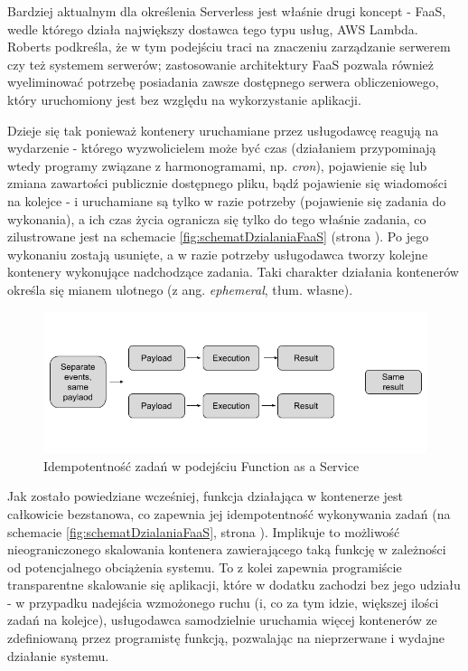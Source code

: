 \documentclass[oneside]{mgr}
\begin{document}
Bardziej aktualnym dla określenia Serverless jest właśnie drugi koncept - FaaS, wedle którego działa największy dostawca tego typu usług, AWS Lambda. Roberts podkreśla, że w tym podejściu traci na znaczeniu zarządzanie serwerem czy też systemem serwerów; zastosowanie architektury FaaS pozwala również wyeliminować potrzebę posiadania zawsze dostępnego serwera obliczeniowego, który uruchomiony jest bez względu na wykorzystanie aplikacji.

Dzieje się tak ponieważ kontenery uruchamiane przez usługodawcę reagują na wydarzenie - którego wyzwolicielem może być czas (działaniem przypominają wtedy programy związane z harmonogramami, np. \textit{cron}), pojawienie się lub zmiana zawartości publicznie dostępnego pliku, bądź pojawienie się wiadomości na kolejce - i uruchamiane są tylko w razie potrzeby (pojawienie się zadania do wykonania), a ich czas życia ogranicza się tylko do tego właśnie zadania, co zilustrowane jest na schemacie \ref{fig:schematDzialaniaFaaS} (strona \pageref{fig:schematDzialaniaFaaS}). Po jego wykonaniu zostają usunięte, a w razie potrzeby usługodawca tworzy kolejne kontenery wykonujące nadchodzące zadania. Taki charakter działania kontenerów określa się mianem ulotnego (z ang. \textit{ephemeral}, tłum. własne).

\begin{figure}
	\centering
	\includegraphics[width=15cm]{0-zJwqKxUVXdMjDboR}
	\caption{Idempotentność zadań w podejściu Function as a Service \cite{kenFrommThinkingServerless}}
	\label{fig:idempotentnoscFaaS}
\end{figure}

Jak zostało powiedziane wcześniej, funkcja działająca w kontenerze jest całkowicie bezstanowa, co zapewnia jej idempotentność wykonywania zadań (na schemacie \ref{fig:schematDzialaniaFaaS}, strona \pageref{fig:schematDzialaniaFaaS}). Implikuje to możliwość nieograniczonego skalowania kontenera zawierającego taką funkcję w zależności od potencjalnego obciążenia systemu. To z kolei zapewnia programiście transparentne skalowanie się aplikacji, które w dodatku zachodzi bez jego udziału - w przypadku nadejścia wzmożonego ruchu (i, co za tym idzie, większej ilości zadań na kolejce), usługodawca samodzielnie uruchamia więcej kontenerów ze zdefiniowaną przez programistę funkcją, pozwalając na nieprzerwane i wydajne działanie systemu.
\end{document}
